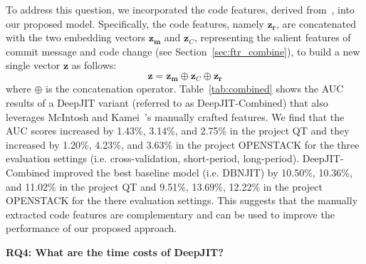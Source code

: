 To address this question, we incorporated the code features, derived from~\cite{mcintosh2018fix}, into our proposed model. Specifically, the code features, namely $\textbf{z}_\textbf{r}$, are concatenated with the two embedding vectors  $\textbf{z}_\textbf{m}$ and $\textbf{z}_C$, representing the salient features of commit message and code change (see Section~\ref{sec:ftr_combine}), to build a new single vector $\textbf{z}$ as follows:
\begin{equation}
\label{eq:combined_ftr}
\textbf{z} = \textbf{z}_\textbf{m} \oplus \textbf{z}_C \oplus \textbf{z}_\textbf{r}
\end{equation}
where $\oplus$ is the concatenation operator. Table~\ref{tab:combined} shows the AUC results of a DeepJIT variant (referred to as DeepJIT-Combined) that also leverages McIntosh and Kamei~\cite{mcintosh2018fix}'s manually crafted features. We find that the AUC scores increased by 1.43\%, 3.14\%, and 2.75\% in the project QT and they increased by 1.20\%, 4.23\%, and 3.63\% in the project OPENSTACK for the three evaluation settings (i.e. cross-validation, short-period, long-period). DeepJIT-Combined improved the best baseline model (i.e. DBNJIT) by 10.50\%, 10.36\%, and 11.02\% in the project QT and 9.51\%, 13.69\%, 12.22\% in the project OPENSTACK for the there evaluation settings. This suggests that the manually extracted code features are complementary and can be used to improve the performance of our proposed approach.

\noindent \textbf{RQ4: What are the time costs of DeepJIT?}

